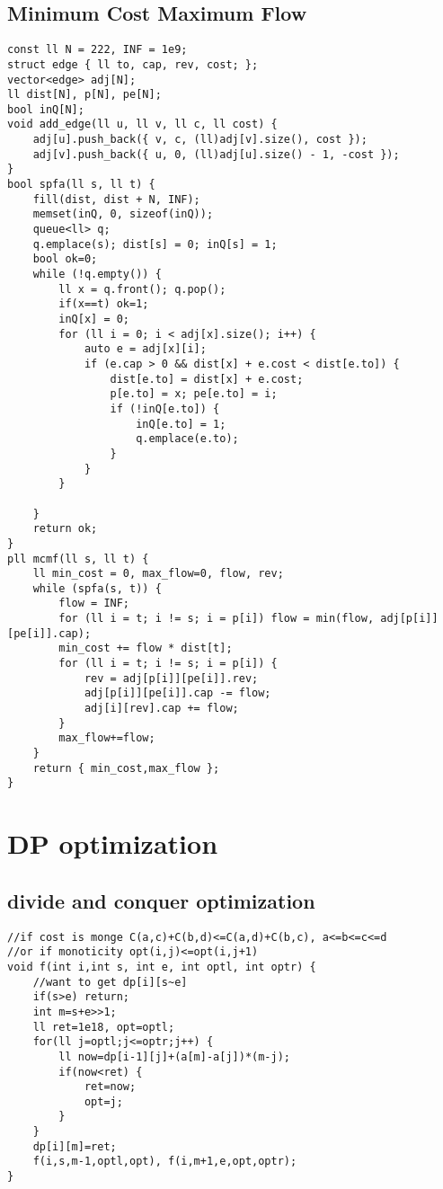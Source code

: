 \documentclass[landscape, 8pt, a4paper, oneside, twocolumn]{extarticle}
\begin{document}
\subsection {Minimum Cost Maximum Flow}
\begin{verbatim}
const ll N = 222, INF = 1e9;
struct edge { ll to, cap, rev, cost; };
vector<edge> adj[N];
ll dist[N], p[N], pe[N];
bool inQ[N];
void add_edge(ll u, ll v, ll c, ll cost) {
	adj[u].push_back({ v, c, (ll)adj[v].size(), cost });
	adj[v].push_back({ u, 0, (ll)adj[u].size() - 1, -cost });
}
bool spfa(ll s, ll t) {
    fill(dist, dist + N, INF);
    memset(inQ, 0, sizeof(inQ));
    queue<ll> q;
    q.emplace(s); dist[s] = 0; inQ[s] = 1;
    bool ok=0;
    while (!q.empty()) {
        ll x = q.front(); q.pop();
        if(x==t) ok=1;
        inQ[x] = 0;
        for (ll i = 0; i < adj[x].size(); i++) {
            auto e = adj[x][i];
            if (e.cap > 0 && dist[x] + e.cost < dist[e.to]) {
                dist[e.to] = dist[x] + e.cost;
                p[e.to] = x; pe[e.to] = i;
                if (!inQ[e.to]) {
                    inQ[e.to] = 1;
                    q.emplace(e.to);
                }
            }
        }

    }
    return ok;
}
pll mcmf(ll s, ll t) {
    ll min_cost = 0, max_flow=0, flow, rev;
    while (spfa(s, t)) {
        flow = INF;
        for (ll i = t; i != s; i = p[i]) flow = min(flow, adj[p[i]][pe[i]].cap);            
        min_cost += flow * dist[t];
        for (ll i = t; i != s; i = p[i]) {
            rev = adj[p[i]][pe[i]].rev;
            adj[p[i]][pe[i]].cap -= flow;
            adj[i][rev].cap += flow;
        }
        max_flow+=flow;
    }
    return { min_cost,max_flow };
}
\end{verbatim}
\newpage
\section{DP optimization}
\subsection {divide and conquer optimization}
\begin{verbatim}
//if cost is monge C(a,c)+C(b,d)<=C(a,d)+C(b,c), a<=b<=c<=d
//or if monoticity opt(i,j)<=opt(i,j+1)
void f(int i,int s, int e, int optl, int optr) {
	//want to get dp[i][s~e]
	if(s>e) return;
	int m=s+e>>1;
	ll ret=1e18, opt=optl;
	for(ll j=optl;j<=optr;j++) {
		ll now=dp[i-1][j]+(a[m]-a[j])*(m-j);
		if(now<ret) {
			ret=now;
			opt=j;
		}
	}
	dp[i][m]=ret;
	f(i,s,m-1,optl,opt), f(i,m+1,e,opt,optr);
}
\end{verbatim}
\vspace{5mm}
\end{document}
